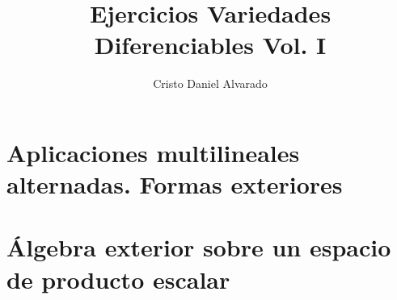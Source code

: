 \documentclass[12pt]{report}
\theoremstyle{largebreak}
\begin{document}
    \setlength{\parskip}{5pt}
    \setlength{\parindent}{12pt}
    \title{Ejercicios Variedades Diferenciables Vol. I}
    \author{Cristo Daniel Alvarado}
    \maketitle

    \tableofcontents

    \lstlistoflistings

    \newpage

    

    \chapter{Aplicaciones multilineales alternadas. Formas exteriores}

    \chapter{Álgebra exterior sobre un espacio de producto escalar}
\end{document}
